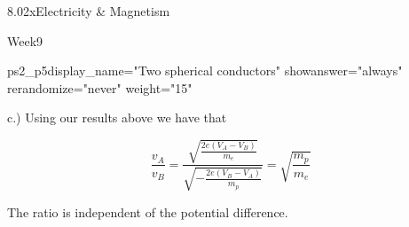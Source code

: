 \documentclass[12pt]{article}
\begin{document}
\begin{edXcourse}{8.02x}{Electricity \& Magnetism}
\begin{edXchapter}{Week9}
\begin{edXsequential}
\begin{edXproblem}{ps2_p5}{display_name="Two spherical conductors" showanswer="always" rerandomize="never" weight="15"}
\begin{edXsolution}
c.) Using our results above we have that

$$\frac{v_{A} }{v_{B} } =\frac{\sqrt{\frac{2e(V_{A} -V_{B} )}{m_{e} } } }{\sqrt{-\frac{2e(V_{B} -V_{A} )}{m_{p} } } } =\sqrt{\frac{m_{p} }{m_{e} } }  $$


The ratio is independent of the potential difference.
\end{edXsolution}

\end{edXproblem}

\end{edXsequential}
\end{edXchapter}
\end{edXcourse}
\end{document}
